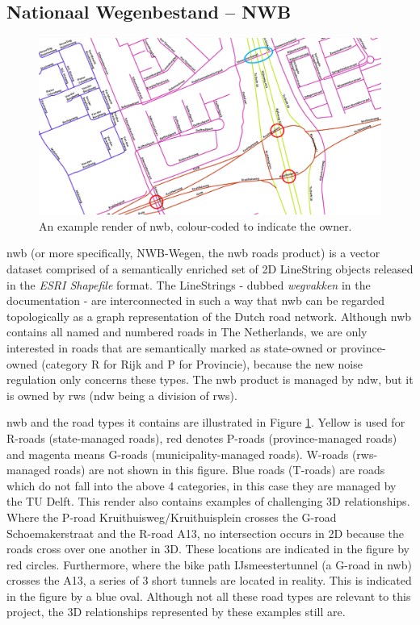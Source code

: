 \subsection{Nationaal Wegenbestand – NWB}
\label{sub:nwb}

\begin{figure}
    \centering
    \includegraphics[width=\linewidth]{final_report/figs/nwb_sample_02.png} 
    \caption{An example render of \ac{nwb}, colour-coded to indicate the owner.}
    \label{fig:nwb}
\end{figure}

\ac{nwb} (or more specifically, NWB-Wegen, the \ac{nwb} roads product) is a vector dataset comprised of a semantically enriched set of 2D LineString objects released in the \textit{ESRI Shapefile} format. The LineStrings - dubbed \textit{wegvakken} in the documentation - are interconnected in such a way that \ac{nwb} can be regarded topologically as a graph representation of the Dutch road network. Although \ac{nwb} contains all named and numbered roads in The Netherlands, we are only interested in roads that are semantically marked as state-owned or province-owned (category R for Rijk and P for Provincie), because the new noise regulation only concerns these types. The \ac{nwb} product is managed by \ac{ndw}, but it is owned by \ac{rws} (\ac{ndw} being a division of \ac{rws}).

\ac{nwb} and the road types it contains are illustrated in Figure \ref{fig:nwb}. Yellow is used for R-roads (state-managed roads), red denotes P-roads (province-managed roads) and magenta means G-roads (municipality-managed roads). W-roads (\ac{rws}-managed roads) are not shown in this figure. Blue roads (T-roads) are roads which do not fall into the above 4 categories, in this case they are managed by the TU Delft. This render also contains examples of challenging 3D relationships. Where the P-road Kruithuisweg/Kruithuisplein crosses the G-road Schoemakerstraat and the R-road A13, no intersection occurs in 2D because the roads cross over one another in 3D. These locations are indicated in the figure by red circles. Furthermore, where the bike path IJsmeestertunnel (a G-road in \ac{nwb}) crosses the A13, a series of 3 short tunnels are located in reality. This is indicated in the figure by a blue oval. Although not all these road types are relevant to this project, the 3D relationships represented by these examples still are.

